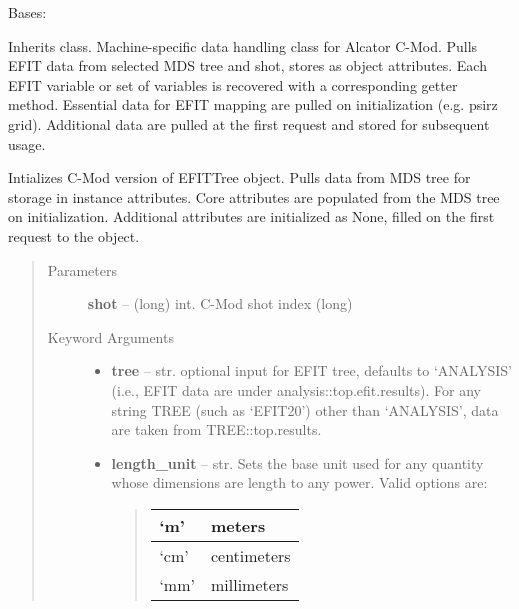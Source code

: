 \documentclass[letterpaper,10pt,english]{sphinxmanual}
\begin{document}
\begin{fulllineitems}
\label{eqtools:eqtools.CModEFIT.CModEFITTree}
Bases: {\hyperref[eqtools:eqtools.EFIT.EFITTree]{}}

Inherits  class. Machine-specific data
handling class for Alcator C-Mod. Pulls EFIT data from selected MDS tree
and shot, stores as object attributes. Each EFIT variable or set of
variables is recovered with a corresponding getter method. Essential data
for EFIT mapping are pulled on initialization (e.g. psirz grid). Additional
data are pulled at the first request and stored for subsequent usage.

Intializes C-Mod version of EFITTree object.  Pulls data from MDS tree for storage
in instance attributes.  Core attributes are populated from the MDS tree on initialization.
Additional attributes are initialized as None, filled on the first request to the object.
\begin{quote}\begin{description}
\item[{Parameters }] \leavevmode
\textbf{shot} --
(long) int. C-Mod shot index (long)

\item[{Keyword Arguments}] \leavevmode\begin{itemize}
\item {} 
\textbf{tree} --
str. optional input for EFIT tree, defaults to `ANALYSIS'
(i.e., EFIT data are under analysis::top.efit.results).
For any string TREE (such as `EFIT20') other than `ANALYSIS',
data are taken from TREE::top.results.

\item {} 
\textbf{length\_unit} --
str. Sets the base unit used for any quantity whose
dimensions are length to any power. Valid options are:
\begin{quote}

\begin{tabulary}{\linewidth}{|L|L|}
\hline

`m'
 & 
meters
\\\hline

`cm'
 & 
centimeters
\\\hline

`mm'
 & 
millimeters
\\\hline


\end{tabulary}
\end{quote}
\end{itemize}
\end{description}
\end{quote}
\end{fulllineitems}
\end{document}
